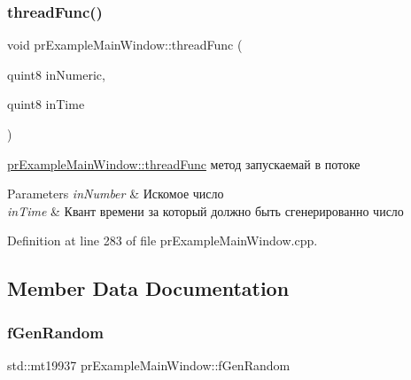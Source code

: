 \mbox{\label{classpr_example_main_window_a65103d7c51e146ffa3f99d999312e38a}} 
\subsubsection{\texorpdfstring{thread\+Func()}{threadFunc()}}
{\footnotesize\ttfamily void pr\+Example\+Main\+Window\+::thread\+Func (\begin{DoxyParamCaption}\item[{quint8}]{in\+Numeric,  }\item[{quint8}]{in\+Time }\end{DoxyParamCaption})\hspace{0.3cm}{\ttfamily [private]}}



\hyperlink{classpr_example_main_window_a65103d7c51e146ffa3f99d999312e38a}{pr\+Example\+Main\+Window\+::thread\+Func} метод запускаемай в потоке 


\begin{DoxyParams}{Parameters}
{\em in\+Number} & Искомое число \\
\hline
{\em in\+Time} & Квант времени за который должно быть сгенерированно число \\
\hline
\end{DoxyParams}


Definition at line 283 of file pr\+Example\+Main\+Window.\+cpp.



\subsection{Member Data Documentation}
\mbox{\label{classpr_example_main_window_a269d30d2d31fe7d0893850776e10888f}} 
\subsubsection{\texorpdfstring{f\+Gen\+Random}{fGenRandom}}
{\footnotesize\ttfamily std\+::mt19937 pr\+Example\+Main\+Window\+::f\+Gen\+Random\hspace{0.3cm}{\ttfamily [private]}}




